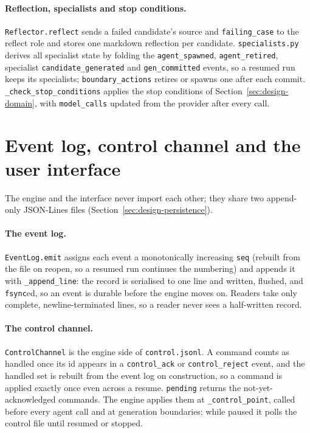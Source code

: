 \paragraph{Reflection, specialists and stop conditions.} \texttt{Reflector.reflect}
sends a failed candidate's source and \texttt{failing\_case} to the reflect role
and stores one markdown reflection per candidate. \texttt{specialists.py} derives
all specialist state by folding the \texttt{agent\_spawned},
\texttt{agent\_retired}, specialist \texttt{candidate\_generated} and
\texttt{gen\_committed} events, so a resumed run keeps its specialists;
\texttt{boundary\_actions} retires or spawns one after each commit.
\texttt{\_check\_stop\_conditions} applies the stop conditions of
Section~\ref{sec:design-domain}, with \texttt{model\_calls} updated from the
provider after every call.

\section{Event log, control channel and the user interface}
\label{sec:impl-ui}

The engine and the interface never import each other; they share two
append-only JSON-Lines files (Section~\ref{sec:design-persistence}).

\paragraph{The event log.} \texttt{EventLog.emit} assigns each event a
monotonically increasing \texttt{seq} (rebuilt from the file on reopen, so a
resumed run continues the numbering) and appends it with
\texttt{\_append\_line}: the record is serialised to one line and written,
flushed, and \texttt{fsync}ed, so an event is durable before the engine moves
on. Readers take only complete, newline-terminated lines, so a reader never
sees a half-written record.

\paragraph{The control channel.} \texttt{ControlChannel} is the engine side of
\texttt{control.jsonl}. A command counts as handled once its id appears in a
\texttt{control\_ack} or \texttt{control\_reject} event, and the handled set is
rebuilt from the event log on construction, so a command is applied exactly once
even across a resume. \texttt{pending} returns the not-yet-acknowledged commands.
The engine applies them at \texttt{\_control\_point}, called before every agent
call and at generation boundaries; while paused it polls the control file until
resumed or stopped.

